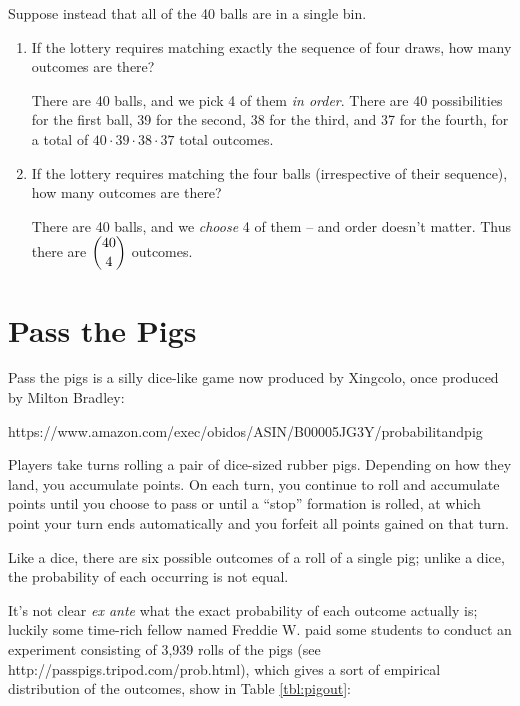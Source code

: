 \documentclass{article}
\newenvironment{solution}{\color{red}}{\color{black}}
\begin{document}
\begin{enumerate}
\begin{enumerate}
\end{enumerate}
Suppose instead that all of the 40 balls are in a single bin.
\begin{enumerate}
\item If the lottery requires matching exactly the sequence of four draws, how many outcomes are there?

\begin{solution}
There are 40 balls, and we pick 4 of them \textit{in order}. There are 40 possibilities for the first ball, 39 for the second, 38 for the third, and 37 for the fourth, for a total of $40\cdot 39\cdot 38\cdot 37$ total outcomes. 
\end{solution}

\item If the lottery requires matching the four balls (irrespective of their sequence), how many outcomes are there?

\begin{solution}
There are 40 balls, and we \textit{choose} 4 of them -- and order doesn't matter. Thus there are $\dbinom{40}4$ outcomes.
\end{solution}

\end{enumerate}
\end{enumerate}

\section{Pass the Pigs}

Pass the pigs is a silly dice-like game now produced by Xingcolo, once produced by Milton Bradley:

https://www.amazon.com/exec/obidos/ASIN/B00005JG3Y/probabilitandpig

Players take turns rolling a pair of dice-sized rubber pigs. Depending on how they land, you accumulate points. On each turn, you continue to roll and accumulate points until you choose to pass or until a ``stop'' formation is rolled, at which point your turn ends automatically and you forfeit all points gained on that turn. 

Like a dice, there are six possible outcomes of a roll of a single pig; unlike a dice, the probability of each occurring is not equal.

It's not clear \textit{ex ante} what the exact probability of each outcome actually is; luckily some time-rich fellow named Freddie W. paid some students to conduct an experiment consisting of 3,939 rolls of the pigs (see http://passpigs.tripod.com/prob.html), which gives a sort of empirical distribution of the outcomes, show in Table \ref{tbl:pigout}:
\end{document}
